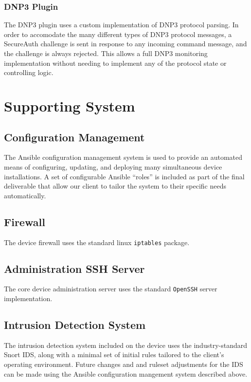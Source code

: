 \subsubsection{DNP3 Plugin}

The DNP3 plugin uses a custom implementation of DNP3 protocol parsing. In order
to accomodate the many different types of DNP3 protocol messages, a SecureAuth
challenge is sent in response to any incoming command message, and the challenge
is always rejected. This allows a full DNP3 monitoring implementation without
needing to implement any of the protocol state or controlling logic.

\section{Supporting System}

\subsection{Configuration Management}

The Ansible configuration management system is used to provide an automated
means of configuring, updating, and deploying many simultaneous device installations.
A set of configurable Ansible ``roles'' is included as part of the final deliverable
that allow our client to tailor the system to their specific needs automatically.

\subsection{Firewall}

The device firewall uses the standard linux \texttt{iptables} package.

\subsection{Administration SSH Server}

The core device administration server uses the standard \texttt{OpenSSH} server
implementation.

\subsection{Intrusion Detection System}

The intrusion detection system included on the device uses the industry-standard
Snort IDS, along with a minimal set of initial rules tailored to the client's
operating environment. Future changes and and ruleset adjustments for the IDS
can be made using the Ansible configuration mangement system described above.
